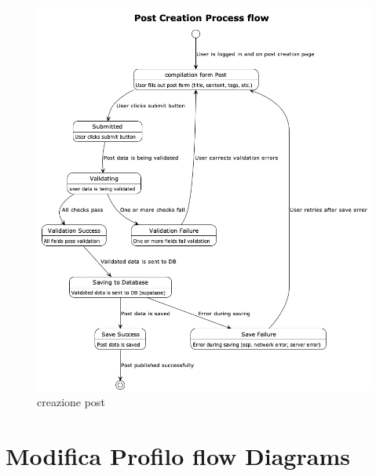 \documentclass{article}
\begin{document}
    \begin{figure}[h]
        \lefting
        \includegraphics[width=1\textwidth]{creazione_post_flow}
        \caption{creazione post}
        \label{fig:figure3}
    \end{figure}

    \clearpage
    \section{Modifica Profilo flow Diagrams}
    \label{sec:modifica_profilo_flow_diagrams}
\end{document}
